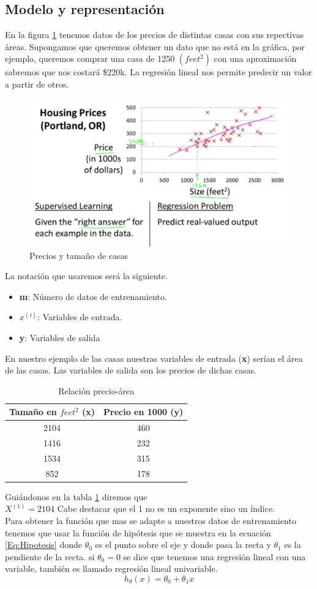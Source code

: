 \documentclass{report}
\begin{document}
\subsection{Modelo y representación}
En la figura \ref{Fig:MR1} tenemos datos de los precios de distintas casas con sus repectivas áreas. Supongamos que queremos obtener un dato que no está en la gráfica, por ejemplo, queremos comprar una casa de 1250 $(feet^2)$ con una aproximación sabremos que nos costará \$220k. 
La regresión lineal nos permite predecir un valor a partir de otros.
\begin{figure}
	\centering
	\includegraphics[scale=0.25]{img/MR1}
	\caption{Precios y tamaño de casas}
	\label{Fig:MR1}
\end{figure}
La notación que usaremos será la siguiente.
\begin{itemize}
	\item \textbf{m}: Número de datos de entrenamiento.
	\item \textbf{$x^{(i)}$}: Variables de entrada.
	\item \textbf{y}: Variables de salida
\end{itemize}
En nuestro ejemplo de las casas nuestras variables de entrada (\textbf{x}) serían el área de las casas. Las variables de salida son los precios de dichas casas.
\begin{table}
	\centering
	\begin{tabular}{c|c}
		Tamaño en $feet^2$ (x) & Precio en 1000 (y)\\
		\hline
		2104&460\\
		1416&232\\
		1534&315\\
		852&178
	\end{tabular}
\caption{Relación precio-área}
\label{Tab:TP}
\end{table}
Guiándonos en la tabla \ref{Tab:TP} diremos que\\$X^{(1)}=2104$ Cabe destacar que el 1 no es un exponente sino un índice.\\
Para obtener la función que mas se adapte a nuestros datos de entrenamiento tenemos que usar la función de hipótesis que se muestra en la ecuación \ref{Eq:Hipotesis} donde $\theta_0$ es el punto sobre el eje y donde pasa la recta y $\theta_1$ es la pendiente de la recta. si $\theta_0=0$ se dice que tenemos una regresión lineal con una variable, también es llamado regresión lineal univariable. 
\begin{equation}
	h_\theta(x)=\theta_0+\theta_1x
	\label{Eq:Hipotesis}
\end{equation}
\end{document}
